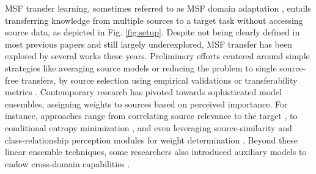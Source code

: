 \documentclass[letterpaper]{article} %
\begin{document}
MSF transfer learning, sometimes referred to as MSF domain adaptation \citep{han2023discriminability}, entails transferring knowledge from multiple sources to a target task without accessing source data, as depicted in Fig. \ref{fig:setup}.
Despite not being clearly defined in most previous papers and still largely underexplored, MSF transfer has been explored by several works these years. Preliminary efforts centered around simple strategies like averaging source models or reducing the problem to single source-free transfers, by source selection using empirical validations or transferability metrics \citep[e.g.][]{yang2023pick}. Contemporary research has pivoted towards sophisticated model ensembles, assigning weights to sources based on perceived importance. For instance, approaches range from correlating source relevance to the target \citep{lee2019learning}, to conditional entropy minimization \citep{ahmed2021unsupervised}, and even leveraging source-similarity and class-relationship perception modules for weight determination \citep{dong2021confident, han2023discriminability}.
Beyond these linear ensemble techniques, some researchers also introduced auxiliary models to endow cross-domain capabilities \citep{li2022source}.
\end{document}

